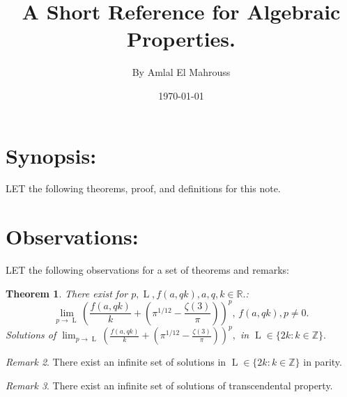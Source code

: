 \documentclass[10pt]{article}
\title{%
	\vspace{-1.5em}%
	\large\textbf{A Short Reference for Algebraic Properties.}%
}
\author{By Amlal El Mahrouss}
\date{\today}
\theoremstyle{plain}
\newtheorem{theorem}{Theorem}[section]
\theoremstyle{definition}
\theoremstyle{remark}
\newtheorem{remark}[theorem]{Remark}
\begin{document}

\maketitle
\tableofcontents
\newpage

\section{Synopsis:}

\lettrine[lines=1, lhang=0.1, loversize=0.2]{L}ET the following theorems, proof, and definitions for this note.

\section{Observations:}

\lettrine[lines=1, lhang=0.1, loversize=0.2]{L}ET the following observations for a set of theorems and remarks:

\begin{theorem}
	There exist for $p, \operatorname{L}, f(a, qk), a, q, k \in \mathbb{R}.$:
	\begin{equation}
		\lim_{p \to \operatorname{L}} (\frac{f(a, qk)}{k} + (\pi^{1/12} - \frac{\zeta(3)}{\pi}))^p, \, f(a, qk), p \neq 0.
	\end{equation}
	Solutions of $\lim_{p \to \operatorname{L}} (\frac{f(a, qk)}{k} + (\pi^{1/12} - \frac{\zeta(3)}{\pi}))^p,$ in  $\operatorname{L} \in \{2k : k \in \mathbb{Z}\}.$
\end{theorem}
\begin{remark}
	There exist an infinite set of solutions in $\operatorname{L} \in \{2k : k \in \mathbb{Z}\}$ in parity.
\end{remark}
\begin{remark}
There exist an infinite set of solutions of transcendental property.
\end{remark}
\end{document}
